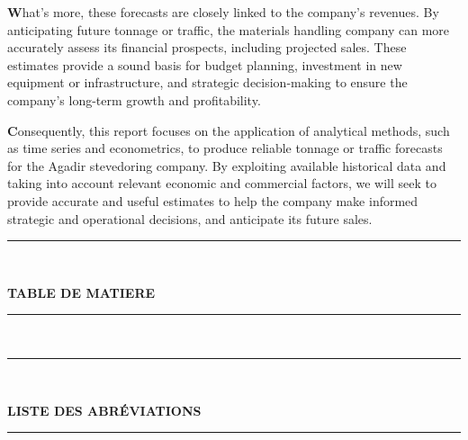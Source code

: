 \documentclass[11pt]{article}
\begin{document}
\textbf{W}hat's more, these forecasts are closely linked to the company's revenues. By anticipating future tonnage or traffic, the materials handling company can more accurately assess its financial prospects, including projected sales. These estimates provide a sound basis for budget planning, investment in new equipment or infrastructure, and strategic decision-making to ensure the company's long-term growth and profitability.\vspace{0.5cm}

\textbf{C}onsequently, this report focuses on the application of analytical methods, such as time series and econometrics, to produce reliable tonnage or traffic forecasts for the Agadir stevedoring company. By exploiting available historical data and taking into account relevant economic and commercial factors, we will seek to provide accurate and useful estimates to help the company make informed strategic and operational decisions, and anticipate its future sales.



\newpage
\begin{center}
    {\color{cyan}\rule{\linewidth}{0.5mm}} \\[1.5ex]
    
    {\color{cyan}\Huge\bfseries TABLE DE MATIERE\par}
    
    {\color{cyan}\rule{\linewidth}{0.5mm}} \\[2ex]
    
\end{center}





\tableofcontents %








\newpage
\begin{center}
    {\color{cyan}\rule{\linewidth}{0.5mm}} \\[1.5ex]
    
    {\color{cyan}\Huge\bfseries LISTE DES ABRÉVIATIONS\par}
    
    {\color{cyan}\rule{\linewidth}{0.5mm}} \\[2ex]
    
\end{center}
\end{document}
